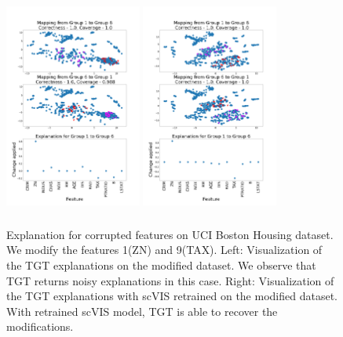 \begin{figure}[H]
\centering
    \includegraphics[width=0.4\textwidth, height=7.2cm]{images/tffigures/housing-t2c.png}
    \includegraphics[width=0.4\textwidth, height=7.2cm]{images/tffigures/housing-retrained-t2c.png}
    \caption{Explanation for corrupted features on UCI Boston Housing dataset. We modify the features 1(ZN) and 9(TAX). Left: Visualization of the TGT explanations on the modified dataset. We observe that TGT returns noisy explanations in this case. Right: Visualization of the TGT explanations with scVIS retrained on the modified dataset. With retrained scVIS model, TGT is able to recover the modifications.}
    \label{fig:t2c-Housing}
\end{figure}
